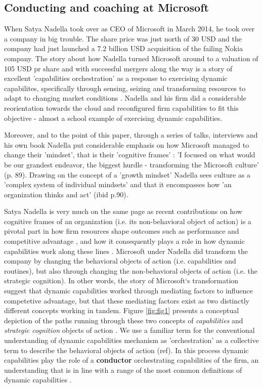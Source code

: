 \documentclass[review,fleqn]{elsarticle}\usepackage[]{graphicx}\usepackage[]{color}
\begin{document}
\subsection*{Conducting and coaching at Microsoft}\label{sec:case}


When Satya Nadella took over as CEO of Microsoft in March 2014, he took over a company in
big trouble. The share price was just north of 30 USD and the company had just launched a
7.2 billion USD acquisition of the failing Nokia company. The story about how Nadella
turned Microsoft around to a valuation of 105 USD pr share and with successful mergers
along the way is a story of excellent 'capabilities orchestration' as a response to exercising
dynamic capabilites, specifically through sensing, seizing and transforming resources to
adapt to changing market conditions \citep{Teece2007}. Nadella and his firm did a
considerable reorientation towards the cloud and reconfigured firm capabilities to fit
this objective - almost a school example of exercising dynamic capabilities.

Moreover, and to the point of this paper, through a series of talks, interviews and his
own book Nadella put considerable emphasis on how Microsoft managed to change their
'mindset', that is their 'cognitive frames' \citep{Nadella2017}: 'I focused on what would be
our grandest endeavor, the biggest hurdle - transforming the Microsoft culture'
(p. 89). Drawing on the concept of a 'growth mindset' \citep{Dweck2016} Nadella sees
culture as a 'complex system of individual mindsets' and that it encompasses how 'an
organization thinks and act' (ibid p.90).

Satya Nadella is very much on the same page as recent contributions on how cognitive
frames of an organization (i.e. its non-behavioral object of action) is a pivotal part in
how firm resources shape outcomes such as performance and competitive advantage
\citep{Barney1991a,Barney2001}, and how it consequently plays a role in how dynamic
capabilities work along these lines \cite{Verona2011}. Microsoft under Nadella did
transform the company by changing the behavioral objects of action (i.e. capabilities and
routines), but also through changing the non-behavioral objects of action (i.e. the
strategic cognition). In other words, the story of Microsoft`s transformation suggest that
dynamic capabilities worked through mediating factors to influence competetive advantage,
but that these mediating factors exist as two distinctly different concepts working in
tandem. Figure \ref{fig:fig1} presents a conceptual depiction of the paths running through
these two concepts of \emph{capabilities} and \emph{strategic cognition} objects of action
\citep{Zollo2016}. We use a familiar term for the conventional understanding of dynamic
capabilities mechanism as 'orchestration' as a collective term to describe the
behavioral objects of action \citep{Verona2011}(ref). In this process dynamic capabilities play the role of
a {\bf conductor} orchestrating capabilities of the firm, an understanding that is in line
with a range of the most common definitions of dynamic capabilities \citep{Schilke2018}.
\end{document}

